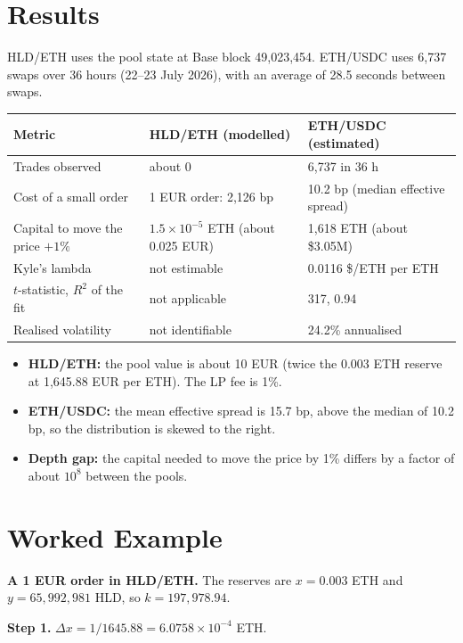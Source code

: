\documentclass[11pt,a4paper]{article}
\begin{document}
\section{Results}

HLD/ETH uses the pool state at Base block 49,023,454. ETH/USDC uses 6,737 swaps over 36 hours (22--23 July 2026), with an average of 28.5 seconds between swaps.

\begin{center}
\begin{tabular}{lll}
\toprule
Metric & HLD/ETH (modelled) & ETH/USDC (estimated) \\
\midrule
Trades observed & about 0 & 6,737 in 36 h \\
Cost of a small order & 1 EUR order: 2,126 bp & 10.2 bp (median effective spread) \\
Capital to move the price $+1\%$ & $1.5\times10^{-5}$ ETH (about 0.025 EUR) & 1,618 ETH (about \$3.05M) \\
Kyle's lambda & not estimable & 0.0116 \$/ETH per ETH \\
$t$-statistic, $R^2$ of the fit & not applicable & 317, 0.94 \\
Realised volatility & not identifiable & 24.2\% annualised \\
\bottomrule
\end{tabular}
\end{center}

\begin{itemize}
\item \textbf{HLD/ETH:} the pool value is about 10 EUR (twice the 0.003 ETH reserve at 1,645.88 EUR per ETH). The LP fee is 1\%.
\item \textbf{ETH/USDC:} the mean effective spread is 15.7 bp, above the median of 10.2 bp, so the distribution is skewed to the right.
\item \textbf{Depth gap:} the capital needed to move the price by 1\% differs by a factor of about $10^8$ between the pools.
\end{itemize}

\section{Worked Example}

\textbf{A 1 EUR order in HLD/ETH.} The reserves are $x=0.003$ ETH and $y=65{,}992{,}981$ HLD, so $k=197{,}978.94$.

\textbf{Step 1.} $\Delta x=1/1645.88=6.0758\times10^{-4}$ ETH.
\end{document}
